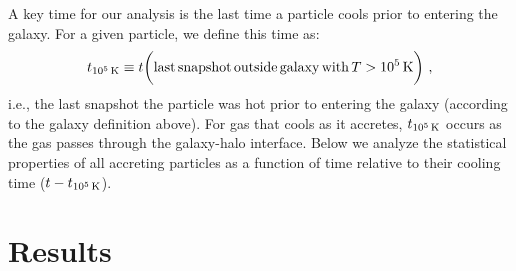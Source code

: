 \documentclass[fleqn,usenatbib]{mnras}
\newcommand{\tcon}{t_{10^5\,{\rm K}}}
\begin{document}
A key time for our analysis is the last time a particle cools prior to entering the galaxy.
For a given particle, we define this time as:
\begin{equation}
    \tcon \equiv t \bigg( {\rm last\,snapshot\,outside\,galaxy\,with\,}T>10^5\,{\rm K} \bigg) ~,
\label{e: tcon}
\end{equation}
i.e., the last snapshot the particle was hot prior to entering the galaxy (according to the galaxy definition above).
For gas that cools as it accretes, $\tcon$ occurs as the gas passes through the galaxy-halo interface.
Below we analyze the statistical properties of all accreting particles as a function of time relative to their cooling time ($t-\tcon$).

\section{Results}
\label{s: results}

\end{document}

